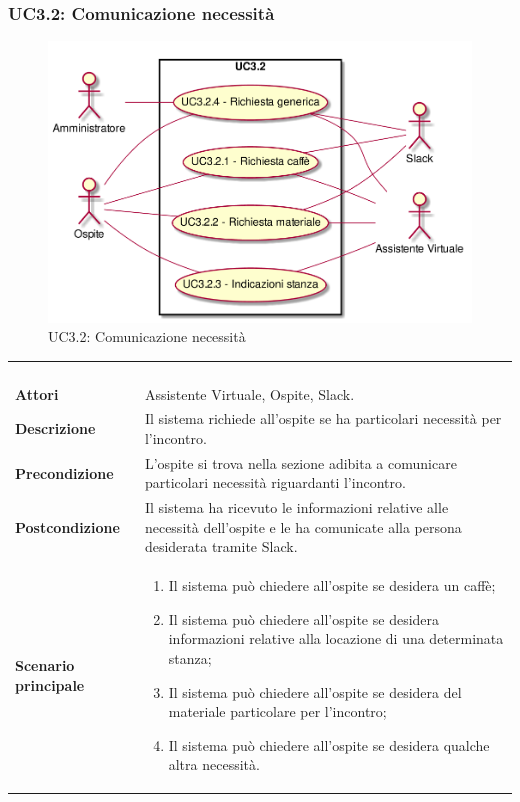 \subsubsection{UC3.2: Comunicazione necessità}
\label{UC3.2}
\begin{figure}[h]
\centering
\includegraphics[width=\textwidth,height=\textheight,keepaspectratio]{images/UseCaseUC32.png}
\caption{UC3.2: Comunicazione necessità}
\end{figure}
\begin{longtable}{l|p{10cm}}
\rowcolor[gray]{0.8} \multicolumn{2}{c}{} \\
\rowcolor[gray]{0.8} \multicolumn{2}{c}{\textbf{UC3.2 - Comunicazione necessità}} \\
\rowcolor[gray]{0.8} \multicolumn{2}{c}{} \\
\hline
&\\
\textbf{Attori} & Assistente Virtuale, Ospite, Slack.\\[7pt]
\textbf{Descrizione} & Il sistema richiede all'ospite se ha particolari necessità per l'incontro.\\[7pt]
\textbf{Precondizione} & L'ospite si trova nella sezione adibita a comunicare particolari necessità riguardanti l'incontro.\\[7pt]
\textbf{Postcondizione} & Il sistema ha ricevuto le informazioni relative alle necessità dell'ospite e le ha comunicate alla persona desiderata tramite Slack.\\[7pt]
\textbf{Scenario principale} &\begin{enumerate}
\item  Il sistema può chiedere all'ospite se desidera un caffè;
\item  Il sistema può chiedere all'ospite se desidera informazioni relative alla locazione di una determinata stanza; 
\item  Il sistema può chiedere all'ospite se desidera del materiale particolare per l'incontro;
\item  Il sistema può chiedere all'ospite se desidera qualche altra necessità.
\end{enumerate}
\\[7pt]\hline
\end{longtable}

